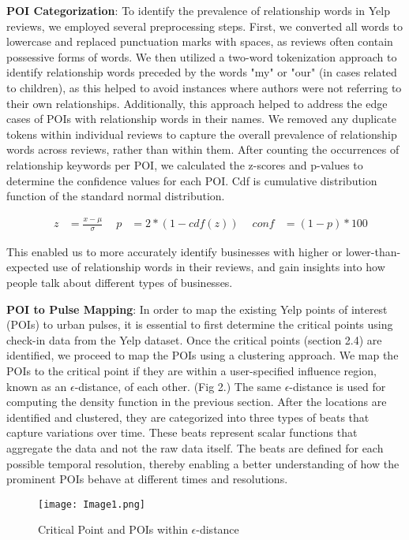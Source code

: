 \textbf{POI Categorization}: To identify the prevalence of relationship words in Yelp reviews, we employed several preprocessing steps. First, we converted all words to lowercase and replaced punctuation marks with spaces, as reviews often contain possessive forms of words. We then utilized a two-word tokenization approach to identify relationship words preceded by the words "my" or "our" (in cases related to children), as this helped to avoid instances where authors were not referring to their own relationships. Additionally, this approach helped to address the edge cases of POIs with relationship words in their names. We removed any duplicate tokens within individual reviews to capture the overall prevalence of relationship words across reviews, rather than within them. After counting the occurrences of relationship keywords per POI, we calculated the z-scores and p-values to determine the confidence values for each POI. Cdf is cumulative distribution function of the standard normal distribution.

\begin{equation}
\begin{aligned}
\quad z &= \frac{x-\mu}{\sigma}\
\quad p &= 2 * (1 - cdf(z))\
\quad conf &= (1 - p) * 100
\end{aligned}
\end{equation}

This enabled us to more accurately identify businesses with higher or lower-than-expected use of relationship words in their reviews, and gain insights into how people talk about different types of businesses.

\textbf{POI to Pulse Mapping}: In order to map the existing Yelp points of interest (POIs) to urban pulses, it is essential to first determine the critical points using check-in data from the Yelp dataset. Once the critical points (section 2.4) are identified, we proceed to map the POIs using a clustering approach. We map the POIs to the critical point if they are within a user-specified influence region, known as an $\epsilon$-distance, of each other. (Fig 2.) The same $\epsilon$-distance is used for computing the density function in the previous section. After the locations are identified and clustered, they are categorized into three types of beats that capture variations over time\cite{b1}. These beats represent scalar functions that aggregate the data and not the raw data itself. The beats are defined for each possible temporal resolution, thereby enabling a better understanding of how the prominent POIs behave at different times and resolutions.

\begin{figure}
    \centering
    \texttt{[image: Image1.png]}
    \caption{Critical Point and POIs within $\epsilon$-distance}
    \label{fig:my_label}
\end{figure}
